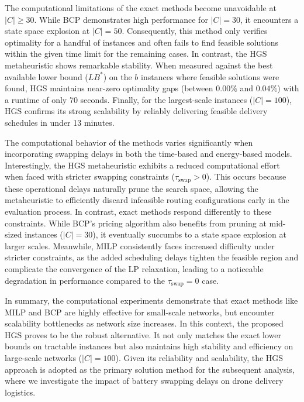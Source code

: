 \documentclass[3p, authoryear, 11pt]{elsarticle}
\begin{document}
The computational limitations of the exact methods become unavoidable at $|C| \ge 30$. While BCP demonstrates high performance for $|C|=30$, it encounters a state space explosion at $|C|=50$. Consequently, this method only verifies optimality for a handful of instances and often fails to find feasible solutions within the given time limit for the remaining cases. In contrast, the HGS metaheuristic shows remarkable stability. When measured against the best available lower bound ($LB^*$) on the $b$ instances where feasible solutions were found, HGS maintains near-zero optimality gaps (between $0.00\%$ and $0.04\%$) with a runtime of only $70$ seconds. Finally, for the largest-scale instances ($|C|=100$), HGS confirms its strong scalability by reliably delivering feasible delivery schedules in under 13 minutes.

The computational behavior of the methods varies significantly when incorporating swapping delays in both the time-based and energy-based models. Interestingly, the HGS metaheuristic exhibits a reduced computational effort when faced with stricter swapping constraints ($\tau_{\mathrm{swap}} > 0$). This occurs because these operational delays naturally prune the search space, allowing the metaheuristic to efficiently discard infeasible routing configurations early in the evaluation process. In contrast, exact methods respond differently to these constraints. While BCP’s pricing algorithm also benefits from pruning at mid-sized instances ($|C|=30$), it eventually succumbs to a state space explosion at larger scales. Meanwhile, MILP consistently faces increased difficulty under stricter constraints, as the added scheduling delays tighten the feasible region and complicate the convergence of the LP relaxation, leading to a noticeable degradation in performance compared to the $\tau_{\mathrm{swap}}=0$ case.

In summary, the computational experiments demonstrate that exact methods like MILP and BCP are highly effective for small-scale networks, but encounter scalability bottlenecks as network size increases. In this context, the proposed HGS proves to be the robust alternative. It not only matches the exact lower bounds on tractable instances but also maintains high stability and efficiency on large-scale networks ($|C|=100$). Given its reliability and scalability, the HGS approach is adopted as the primary solution method for the subsequent analysis, where we investigate the impact of battery swapping delays on drone delivery logistics.
\end{document}
